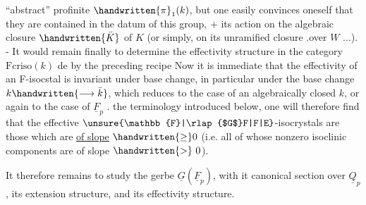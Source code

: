 
``abstract'' profinite $\handwritten{\pi}_1(k)$, but one easily convinces oneself that they are contained in the datum of this group, $+$ its action on the algebraic closure $\handwritten{\bar{K}}$ of $K$ (or simply, on its unramified closure .over $W$ ...). - It would remain finally to determine the effectivity structure in the category $\mathrm{Fcriso}(k)$ de by the preceding recipe Now it is immediate that the effectivity of an F-isocstal is invariant under base change, in particular under the base change $k\handwritten{\longrightarrow\bar{k}}$, which reduces to the case of an algebraically closed $k$, or again to the case of $\underline{F}_p$ .   the terminology introduced below, one will therefore find that the effective $\unsure{\mathbb{F}|\rlap{$G$}F|F|E}$-isocrystals are those which are \uline{of slope} $\handwritten{\geq}0$ (i.e. all of whose nonzero isoclinic components  are of slope $\handwritten{>}\ 0$).

 It therefore remains to study the gerbe $\underline{G}(\underline{F}_p)$, with it  canonical section over $\underline{Q}_p$, its extension structure, and its effectivity structure.

